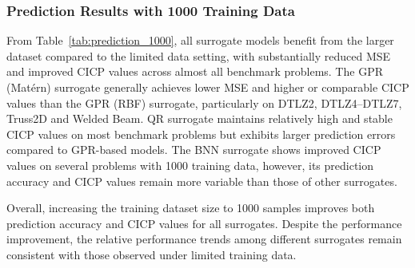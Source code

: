 \documentclass{article}
\begin{document}
\subsubsection{Prediction Results with 1000 Training Data}
From Table~\ref{tab:prediction_1000}, all surrogate models benefit from the larger dataset compared to the limited data setting, with substantially reduced MSE and improved CICP values across almost all benchmark problems. The GPR (Matérn) surrogate generally achieves lower MSE and higher or comparable CICP values than the GPR (RBF) surrogate, particularly on DTLZ2, DTLZ4–DTLZ7, Truss2D and Welded Beam. QR surrogate maintains relatively high and stable CICP values on most benchmark problems but exhibits larger prediction errors compared to GPR-based models. The BNN surrogate shows improved CICP values on several problems with 1000 training data, however, its prediction accuracy  and CICP values remain more variable than those of other surrogates.

Overall, increasing the training dataset size to 1000 samples improves both prediction accuracy and CICP values for all surrogates. Despite the performance improvement, the relative performance trends among different surrogates remain consistent with those observed under limited training data.
\end{document}
